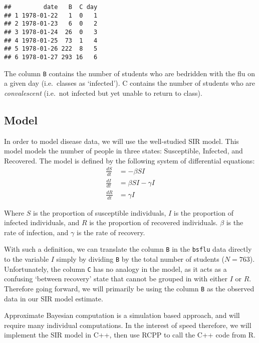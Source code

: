 \documentclass[
]{article}
\begin{document}
\begin{verbatim}
##         date   B  C day
## 1 1978-01-22   1  0   1
## 2 1978-01-23   6  0   2
## 3 1978-01-24  26  0   3
## 4 1978-01-25  73  1   4
## 5 1978-01-26 222  8   5
## 6 1978-01-27 293 16   6
\end{verbatim}

The column \texttt{B} contains the number of students who are bedridden
with the flu on a given day (i.e.~classes as `infected'). C contains the
number of students who are \emph{convalescent} (i.e.~not infected but
yet unable to return to class).

\hypertarget{model}{%
\subsection{Model}\label{model}}

In order to model disease data, we will use the well-studied SIR model.
This model models the number of people in three states: Susceptible,
Infected, and Recovered. The model is defined by the following system of
differential equations: \[
\begin{align*}
\frac{dS}{dt} &= -\beta S I \\
\frac{dI}{dt} &= \beta S I - \gamma I \\
\frac{dR}{dt} &= \gamma I
\end{align*}
\]

Where \(S\) is the proportion of susceptible individuals, \(I\) is the
proportion of infected individuals, and \(R\) is the proportion of
recovered individuals. \(\beta\) is the rate of infection, and
\(\gamma\) is the rate of recovery.

With such a definition, we can translate the column \texttt{B} in the
\texttt{bsflu} data directly to the variable \(I\) simply by dividing
\texttt{B} by the total number of students (\(N=763\)). Unfortunately,
the column \texttt{C} has no analogy in the model, as it acts as a
confusing `between recovery' state that cannot be grouped in with either
\(I\) or \(R\). Therefore going forward, we will primarily be using the
column \texttt{B} as the observed data in our SIR model estimate.

Approximate Bayesian computation is a simulation based approach, and
will require many individual computations. In the interest of speed
therefore, we will implement the SIR model in C++, then use RCPP to call
the C++ code from R.
\end{document}
